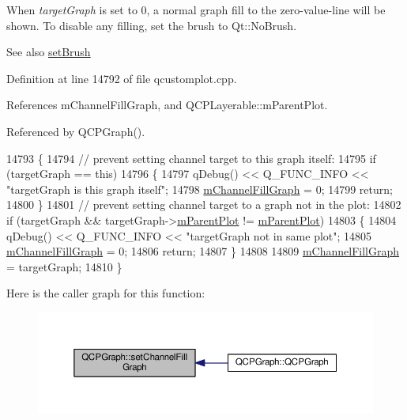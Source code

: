 When {\itshape target\+Graph} is set to 0, a normal graph fill to the zero-\/value-\/line will be shown. To disable any filling, set the brush to Qt\+::\+No\+Brush.

\begin{DoxySeeAlso}{See also}
\hyperlink{class_q_c_p_abstract_plottable_a7a4b92144dca6453a1f0f210e27edc74}{set\+Brush} 
\end{DoxySeeAlso}


Definition at line 14792 of file qcustomplot.\+cpp.



References m\+Channel\+Fill\+Graph, and Q\+C\+P\+Layerable\+::m\+Parent\+Plot.



Referenced by Q\+C\+P\+Graph().


\begin{DoxyCode}
14793 \{
14794   \textcolor{comment}{// prevent setting channel target to this graph itself:}
14795   \textcolor{keywordflow}{if} (targetGraph == \textcolor{keyword}{this})
14796   \{
14797     qDebug() << Q\_FUNC\_INFO << \textcolor{stringliteral}{"targetGraph is this graph itself"};
14798     \hyperlink{class_q_c_p_graph_a2f1777c7accf8244fc640c33f0b04577}{mChannelFillGraph} = 0;
14799     \textcolor{keywordflow}{return};
14800   \}
14801   \textcolor{comment}{// prevent setting channel target to a graph not in the plot:}
14802   \textcolor{keywordflow}{if} (targetGraph && targetGraph->\hyperlink{class_q_c_p_layerable_aa2a528433e44db02b8aef23c1f9f90ed}{mParentPlot} != \hyperlink{class_q_c_p_layerable_aa2a528433e44db02b8aef23c1f9f90ed}{mParentPlot})
14803   \{
14804     qDebug() << Q\_FUNC\_INFO << \textcolor{stringliteral}{"targetGraph not in same plot"};
14805     \hyperlink{class_q_c_p_graph_a2f1777c7accf8244fc640c33f0b04577}{mChannelFillGraph} = 0;
14806     \textcolor{keywordflow}{return};
14807   \}
14808   
14809   \hyperlink{class_q_c_p_graph_a2f1777c7accf8244fc640c33f0b04577}{mChannelFillGraph} = targetGraph;
14810 \}
\end{DoxyCode}


Here is the caller graph for this function\+:\nopagebreak
\begin{figure}[H]
\begin{center}
\leavevmode
\includegraphics[width=350pt]{class_q_c_p_graph_a2d03156df1b64037a2e36cfa50351ca3_icgraph}
\end{center}
\end{figure}


